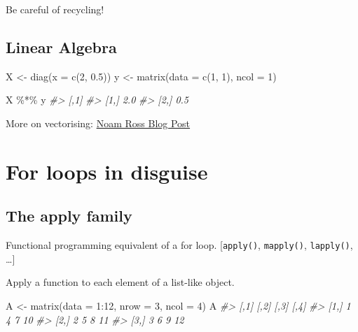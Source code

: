 \documentclass[
  12pt,
]{book}
\newenvironment{Shaded}{\begin{snugshade}}{\end{snugshade}}
\newcommand{\AttributeTok}[1]{\textcolor[rgb]{0.77,0.63,0.00}{#1}}
\newcommand{\CommentTok}[1]{\textcolor[rgb]{0.56,0.35,0.01}{\textit{#1}}}
\newcommand{\DecValTok}[1]{\textcolor[rgb]{0.00,0.00,0.81}{#1}}
\newcommand{\FloatTok}[1]{\textcolor[rgb]{0.00,0.00,0.81}{#1}}
\newcommand{\FunctionTok}[1]{\textcolor[rgb]{0.00,0.00,0.00}{#1}}
\newcommand{\NormalTok}[1]{#1}
\newcommand{\OtherTok}[1]{\textcolor[rgb]{0.56,0.35,0.01}{#1}}
\newcommand{\SpecialCharTok}[1]{\textcolor[rgb]{0.00,0.00,0.00}{#1}}
\begin{document}
Be careful of recycling!

\hypertarget{linear-algebra}{%
\subsection{Linear Algebra}\label{linear-algebra}}

\begin{Shaded}
\begin{Highlighting}[]
\NormalTok{X }\OtherTok{\textless{}{-}} \FunctionTok{diag}\NormalTok{(}\AttributeTok{x =} \FunctionTok{c}\NormalTok{(}\DecValTok{2}\NormalTok{, }\FloatTok{0.5}\NormalTok{))}
\NormalTok{y }\OtherTok{\textless{}{-}} \FunctionTok{matrix}\NormalTok{(}\AttributeTok{data =} \FunctionTok{c}\NormalTok{(}\DecValTok{1}\NormalTok{, }\DecValTok{1}\NormalTok{), }\AttributeTok{ncol =} \DecValTok{1}\NormalTok{)}

\NormalTok{X }\SpecialCharTok{\%*\%}\NormalTok{ y}
\CommentTok{\#\textgreater{}      [,1]}
\CommentTok{\#\textgreater{} [1,]  2.0}
\CommentTok{\#\textgreater{} [2,]  0.5}
\end{Highlighting}
\end{Shaded}

More on vectorising: \href{http://www.noamross.net/archives/2014-04-16-vectorization-in-r-why/}{Noam Ross Blog Post}

\hypertarget{for-loops-in-disguise}{%
\section{For loops in disguise}\label{for-loops-in-disguise}}

\hypertarget{the-apply-family}{%
\subsection{The apply family}\label{the-apply-family}}

Functional programming equivalent of a for loop. {[}\texttt{apply()}, \texttt{mapply()}, \texttt{lapply()}, \ldots{]}

Apply a function to each element of a list-like object.

\begin{Shaded}
\begin{Highlighting}[]
\NormalTok{A }\OtherTok{\textless{}{-}} \FunctionTok{matrix}\NormalTok{(}\AttributeTok{data =} \DecValTok{1}\SpecialCharTok{:}\DecValTok{12}\NormalTok{, }\AttributeTok{nrow =} \DecValTok{3}\NormalTok{, }\AttributeTok{ncol =} \DecValTok{4}\NormalTok{)}
\NormalTok{A}
\CommentTok{\#\textgreater{}      [,1] [,2] [,3] [,4]}
\CommentTok{\#\textgreater{} [1,]    1    4    7   10}
\CommentTok{\#\textgreater{} [2,]    2    5    8   11}
\CommentTok{\#\textgreater{} [3,]    3    6    9   12}
\end{Highlighting}
\end{Shaded}
\end{document}
